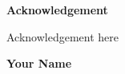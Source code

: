 \thispagestyle{plain}
\begin{center}
\textbf{\textbf{\fontsize{16pt}{24pt}\selectfont Acknowledgement}}
\end{center}

\vspace{0.3cm}
\fontsize{12pt}{18pt}\selectfont 

Acknowledgement here

\begin{flushright}
\textbf{Your Name}
\end{flushright}

\newpage